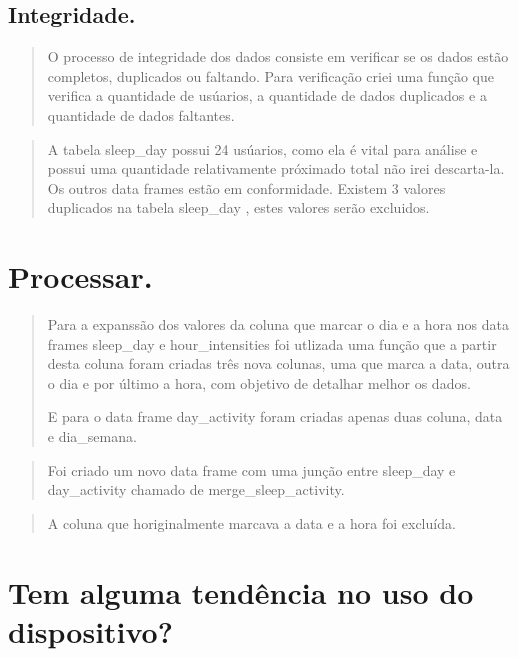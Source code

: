 \documentclass[a4paper, oneside]{report}
\begin{document}
\section*{Integridade.}

\begin{quotation}
    O processo de integridade dos dados consiste em verificar se os dados estão completos, duplicados ou faltando. Para verificação criei uma função que verifica a quantidade de usúarios, a quantidade de dados duplicados e a quantidade de dados faltantes.
\end{quotation}



\begin{quotation}
    A tabela sleep\_day possui 24 usúarios, como ela é vital para análise e possui uma quantidade relativamente próximado total não irei descarta-la. Os outros data frames estão em conformidade. Existem 3 valores duplicados na tabela sleep\_day , estes valores serão excluidos.
\end{quotation}



\chapter*{Processar.}
\begin{quotation}
    Para a expanssão dos valores da coluna que marcar o dia e a hora nos data frames sleep\_day e hour\_intensities foi utlizada uma função que a partir desta coluna foram criadas três nova colunas, uma que marca a data, outra o dia e por último a hora, com objetivo de detalhar melhor os dados.
    
    E para o data frame day\_activity foram criadas apenas duas coluna, data e dia\_semana.
\end{quotation}

\begin{quotation}
Foi criado um novo data frame com uma junção entre sleep\_day e day\_activity chamado de merge\_sleep\_activity.
\end{quotation}

\begin{quotation}
A coluna que horiginalmente marcava a data e a hora foi excluída.
\end{quotation}




\chapter*{Tem alguma tendência no uso do dispositivo?}
\end{document}

